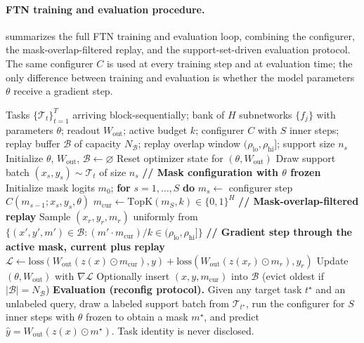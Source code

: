 \documentclass[11pt]{article}
\begin{document}
\paragraph{FTN training and evaluation procedure.}
 summarizes the full FTN training and evaluation loop, combining the configurer, the mask-overlap-filtered replay, and the support-set-driven evaluation protocol. The same configurer $C$ is used at every training step and at evaluation time; the only difference between training and evaluation is whether the model parameters $\theta$ receive a gradient step.

\begin{algorithm}[t]
\caption{Functional Task Networks: training and reconfig evaluation}
\label{alg:ftn}
\begin{algorithmic}[1]
\REQUIRE Tasks $\{\mathcal{T}_t\}_{t=1}^{T}$ arriving block-sequentially; bank of $H$ subnetworks $\{f_j\}$ with parameters $\theta$; readout $W_\mathrm{out}$; active budget $k$; configurer $C$ with $S$ inner steps; replay buffer $\mathcal{B}$ of capacity $N_\mathcal{B}$; replay overlap window $(\rho_\mathrm{lo}, \rho_\mathrm{hi}]$; support size $n_s$
\STATE Initialize $\theta$, $W_\mathrm{out}$, $\mathcal{B}\leftarrow\varnothing$
    \STATE Reset optimizer state for $(\theta, W_\mathrm{out})$
        \STATE Draw support batch $(x_s, y_s)\sim \mathcal{T}_t$ of size $n_s$
        \STATE \textbf{// Mask configuration with $\theta$ frozen}
        \STATE Initialize mask logits $m_0$; \textbf{for} $s=1,\dots,S$ \textbf{do} $m_s \leftarrow$ configurer step $C(m_{s-1}; x_s, y_s, \theta)$
        \STATE $m_\mathrm{cur} \leftarrow \mathrm{TopK}(m_S, k) \in \{0,1\}^H$
        \STATE \textbf{// Mask-overlap-filtered replay}
        \STATE Sample $(x_r, y_r, m_r)$ uniformly from $\{(x', y', m')\in\mathcal{B} : (m'\!\cdot m_\mathrm{cur})/k \in (\rho_\mathrm{lo}, \rho_\mathrm{hi}]\}$
        \STATE \textbf{// Gradient step through the active mask, current plus replay}
        \STATE $\mathcal{L} \leftarrow \mathrm{loss}(W_\mathrm{out}(z(x)\odot m_\mathrm{cur}), y) + \mathrm{loss}(W_\mathrm{out}(z(x_r)\odot m_r), y_r)$
        \STATE Update $(\theta, W_\mathrm{out})$ with $\nabla \mathcal{L}$
        \STATE Optionally insert $(x, y, m_\mathrm{cur})$ into $\mathcal{B}$ (evict oldest if $|\mathcal{B}|=N_\mathcal{B}$)
    \ENDFOR
\ENDFOR
\STATE \textbf{Evaluation (reconfig protocol).} Given any target task $t^\star$ and an unlabeled query, draw a labeled support batch from $\mathcal{T}_{t^\star}$, run the configurer for $S$ inner steps with $\theta$ frozen to obtain a mask $m^\star$, and predict $\hat{y} = W_\mathrm{out}(z(x)\odot m^\star)$. Task identity is never disclosed.
\end{algorithmic}
\end{algorithm}
\end{document}
